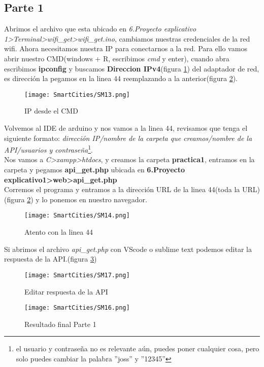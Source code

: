 \documentclass[
	12pt, %
	fleqn, %
	a4paper, %
	oneside, %
]{LegrandOrangeBook}
\begin{document}
\subsection{Parte 1}
Abrimos el archivo que esta ubicado en \textit{6.Proyecto explicativo 1>Terminal>wifi\_get>wifi\_get.ino}, cambiamos nuestras credenciales de la red wifi. Ahora necesitamos nuestra IP para conectarnos a la red. Para ello vamos abrir nuestro CMD(windows + R, escribimos \textit{cmd} y enter), cuando abra escribimos \textbf{ipconfig} y buscamos \textbf{Direccion IPv4}(figura \ref{fig:ipcmd}) del adaptador de red, es dirección la pegamos en la linea 44 reemplazando a la anterior(figura \ref{fig:linea44}).
\begin{figure}[H]
\centering\texttt{[image: SmartCities/SM13.png]}
\caption{IP desde el CMD}
\label{fig:ipcmd}
\end{figure}
Volvemos al IDE de arduino y nos vamos a la linea 44, revisamos que tenga el siguiente formato: \textit{dirección IP/nombre de la carpeta que creamos/nombre de la API/usuarios y contraseña}\footnote{el usuario y contraseña no es relevante aún, puedes poner cualquier cosa, pero solo puedes cambiar la palabra ''joss'' y ''12345''}.\\
Nos vamos a \textit{C>xampp>htdocs}, y creamos la carpeta \textbf{practica1}, entramos en la carpeta y pegamos \textbf{api\_get.php} ubicada en \textbf{6.Proyecto explicativo1>web>api\_get.php}\\
Corremos el programa y entramos a la dirección URL de la linea 44(toda la URL)(figura \ref{fig:linea44}) y lo ponemos en nuestro navegador.
\begin{figure}[H]
\centering\texttt{[image: SmartCities/SM14.png]}
\caption{Atento con la linea 44}
\label{fig:linea44}
\end{figure}
Si abrimos el archivo \textit{api\_get.php} con VScode o sublime text podemos editar la respuesta de la API.(figura \ref{fig:apiedi})
\begin{figure}[H]
\centering\texttt{[image: SmartCities/SM17.png]}
\caption{Editar respuesta de la API}
\label{fig:apiedi}
\end{figure}
\begin{figure}[H]
\centering\texttt{[image: SmartCities/SM16.png]}
\caption{Resultado final Parte 1}
\label{fig:finpart1}
\end{figure}
\end{document}

